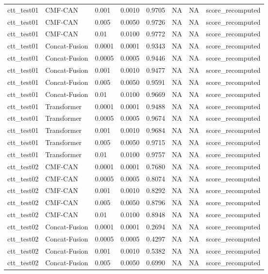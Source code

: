\begin{tabular}{llllllll}
ctt_test01 & CMF-CAN & 0.001 & 0.0010 & 0.9705 & NA & NA & score_recomputed \\
ctt_test01 & CMF-CAN & 0.005 & 0.0050 & 0.9726 & NA & NA & score_recomputed \\
ctt_test01 & CMF-CAN & 0.01 & 0.0100 & 0.9772 & NA & NA & score_recomputed \\
ctt_test01 & Concat-Fusion & 0.0001 & 0.0001 & 0.9343 & NA & NA & score_recomputed \\
ctt_test01 & Concat-Fusion & 0.0005 & 0.0005 & 0.9446 & NA & NA & score_recomputed \\
ctt_test01 & Concat-Fusion & 0.001 & 0.0010 & 0.9477 & NA & NA & score_recomputed \\
ctt_test01 & Concat-Fusion & 0.005 & 0.0050 & 0.9591 & NA & NA & score_recomputed \\
ctt_test01 & Concat-Fusion & 0.01 & 0.0100 & 0.9669 & NA & NA & score_recomputed \\
ctt_test01 & Transformer & 0.0001 & 0.0001 & 0.9488 & NA & NA & score_recomputed \\
ctt_test01 & Transformer & 0.0005 & 0.0005 & 0.9674 & NA & NA & score_recomputed \\
ctt_test01 & Transformer & 0.001 & 0.0010 & 0.9684 & NA & NA & score_recomputed \\
ctt_test01 & Transformer & 0.005 & 0.0050 & 0.9715 & NA & NA & score_recomputed \\
ctt_test01 & Transformer & 0.01 & 0.0100 & 0.9757 & NA & NA & score_recomputed \\
ctt_test02 & CMF-CAN & 0.0001 & 0.0001 & 0.7680 & NA & NA & score_recomputed \\
ctt_test02 & CMF-CAN & 0.0005 & 0.0005 & 0.8074 & NA & NA & score_recomputed \\
ctt_test02 & CMF-CAN & 0.001 & 0.0010 & 0.8292 & NA & NA & score_recomputed \\
ctt_test02 & CMF-CAN & 0.005 & 0.0050 & 0.8796 & NA & NA & score_recomputed \\
ctt_test02 & CMF-CAN & 0.01 & 0.0100 & 0.8948 & NA & NA & score_recomputed \\
ctt_test02 & Concat-Fusion & 0.0001 & 0.0001 & 0.2694 & NA & NA & score_recomputed \\
ctt_test02 & Concat-Fusion & 0.0005 & 0.0005 & 0.4297 & NA & NA & score_recomputed \\
ctt_test02 & Concat-Fusion & 0.001 & 0.0010 & 0.5382 & NA & NA & score_recomputed \\
ctt_test02 & Concat-Fusion & 0.005 & 0.0050 & 0.6990 & NA & NA & score_recomputed \\

\end{tabular}
